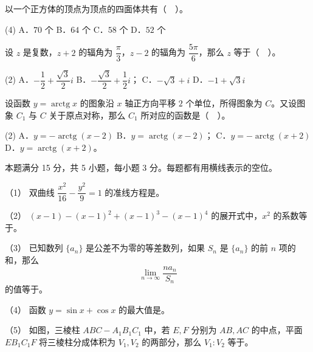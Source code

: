\begin{question}
以一个正方体的顶点为顶点的四面体共有（　）。

\begin{gkopts}(4)
\task A．$70$ 个
\task B．$64$ 个
\task C．$58$ 个
\task D．$52$ 个
\end{gkopts}

\end{question}
\begin{question}
设 $z$ 是复数，$z+2$ 的辐角为 $\dfrac\pi3$，$z-2$ 的辐角为 $\dfrac{5\pi}6$，那么 $z$ 等于（　）。

\begin{gkopts}(2)
\task A．$-\dfrac12+\dfrac{\sqrt3}2i$
\task B．$-\dfrac{\sqrt3}2+\dfrac12i$；
\task C．$-\sqrt3+i$
\task D．$-1+\sqrt3i$
\end{gkopts}

\end{question}
\begin{question}
设函数 $y=\operatorname{arctg}x$ 的图象沿 $x$ 轴正方向平移 $2$ 个单位，所得图象为 $C$。又设图象 $C_1$ 与 $C$ 关于原点对称，那么 $C_1$ 所对应的函数是（　）。

\begin{gkopts}(2)
\task A．$y=-\operatorname{arctg}(x-2)$
\task B．$y=\operatorname{arctg}(x-2)$；
\task C．$y=-\operatorname{arctg}(x+2)$
\task D．$y=\operatorname{arctg}(x+2)$。
\end{gkopts}

\end{question}


本题满分 15 分，共 5 小题，每小题 3 分。每题都有用横线表示的空位。

\Needspace{0.4\textheight}
\begin{question}

（1） 双曲线 $\dfrac{x^2}{16}-\dfrac{y^2}{9}=1$ 的准线方程是\gkblank{}。

（2） $(x-1)-(x-1)^2+(x-1)^3-(x-1)^4$ 的展开式中，$x^2$ 的系数等于\gkblank{}。

（3） 已知数列 $\{a_n\}$ 是公差不为零的等差数列，如果 $S_n$ 是 $\{a_n\}$ 的前 $n$ 项的和，那么
\nopagebreak[4]
\[
\lim_{n\to\infty}\frac{na_n}{S_n}
\]
的值等于\gkblank{}。

（4） 函数 $y=\sin x+\cos x$ 的最大值是\gkblank{}。

（5） 如图，三棱柱 $ABC-A_1B_1C_1$ 中，若 $E,F$ 分别为 $AB,AC$ 的中点，平面 $EB_1C_1F$ 将三棱柱分成体积为 $V_1,V_2$ 的两部分，那么 $V_1:V_2$ 等于\gkblank{}。
\nopagebreak[4]
\begin{center}\end{center}
\nopagebreak[4]
\end{question}

